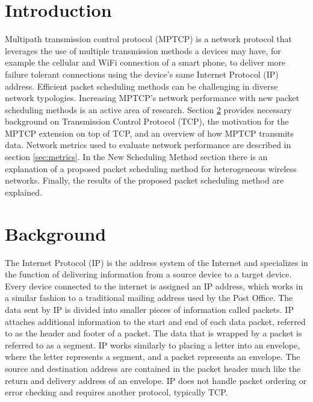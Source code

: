 \documentclass[sigplan,screen,nonacm]{acmart}
\begin{document}
\section{Introduction}
\label{sec:introduction}
Multipath transmission control protocol (MPTCP) is a network protocol that leverages 
the use of multiple transmission methods a devices may have, for example the cellular and WiFi connection of a smart phone, 
to deliver more failure tolerant connections using the device's same Internet Protocol (IP) address. Efficient packet scheduling methods can be challenging in diverse network typologies. Increasing MPTCP's network performance with new packet scheduling methods is an active area of research. Section \ref{sec:background} provides necessary background on
Transmission Control Protocol (TCP), the motivation for the MPTCP extension on top of TCP, and an overview of how MPTCP transmits data. Network metrics used to evaluate network performance are described in section \ref{sec:metrics}. In the New Scheduling Method section there is an explanation of a proposed packet scheduling method for heterogeneous wireless networks. Finally, the results of the proposed packet scheduling method are explained.


\section{Background}
\label{sec:background}
The Internet Protocol (IP) is the address system of the Internet and specializes in the function of delivering information from a source device to a target device. Every device connected to the internet is assigned an IP address, which works in a similar fashion to a traditional mailing address used by the Post Office. The data sent by IP is divided into smaller pieces of information called packets. IP attaches additional information to the start and end of each data packet, referred to as the header and footer of a packet. The data that is wrapped by a packet is referred to as a segment. IP works similarly to placing a letter into an envelope, where the letter represents a segment, and a packet represents an envelope. The source and destination address are contained in the packet header much like the return and delivery address of an envelope. IP does not handle packet ordering or error checking and requires another protocol, typically TCP.
\end{document}
